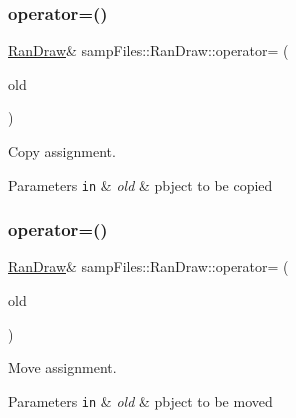 \subsubsection{\texorpdfstring{operator=()}{operator=()}\hspace{0.1cm}{\footnotesize\ttfamily [1/2]}}
{\footnotesize\ttfamily \hyperlink{classsamp_files_1_1_ran_draw}{Ran\+Draw}\& samp\+Files\+::\+Ran\+Draw\+::operator= (\begin{DoxyParamCaption}\item[{const \hyperlink{classsamp_files_1_1_ran_draw}{Ran\+Draw} \&}]{old }\end{DoxyParamCaption})\hspace{0.3cm}{\ttfamily [default]}}



Copy assignment. 


\begin{DoxyParams}[1]{Parameters}
\mbox{\tt in}  & {\em old} & pbject to be copied \\
\hline
\end{DoxyParams}
\mbox{\label{classsamp_files_1_1_ran_draw_a00ab2134a1acce5352195c085744b1bf}} 
\subsubsection{\texorpdfstring{operator=()}{operator=()}\hspace{0.1cm}{\footnotesize\ttfamily [2/2]}}
{\footnotesize\ttfamily \hyperlink{classsamp_files_1_1_ran_draw}{Ran\+Draw}\& samp\+Files\+::\+Ran\+Draw\+::operator= (\begin{DoxyParamCaption}\item[{\hyperlink{classsamp_files_1_1_ran_draw}{Ran\+Draw} \&\&}]{old }\end{DoxyParamCaption})\hspace{0.3cm}{\ttfamily [default]}}



Move assignment. 


\begin{DoxyParams}[1]{Parameters}
\mbox{\tt in}  & {\em old} & pbject to be moved \\
\hline
\end{DoxyParams}
\mbox{\label{classsamp_files_1_1_ran_draw_adaa98fd478582702700f4c86884c0966}} 
